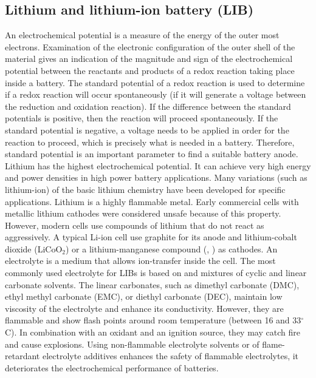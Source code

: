 {\subsection{Lithium and lithium-ion battery (LIB)}
An electrochemical potential is a measure of the energy of the outer most electrons. Examination of the electronic configuration of the outer shell of the material gives an indication of the magnitude and sign of the electrochemical potential between the reactants and products of a redox reaction taking place inside a battery. The standard potential of a redox reaction is used to determine if a redox reaction will occur spontaneously (if it will generate a voltage between the reduction and oxidation reaction). If the difference between the standard potentials is positive, then the reaction will proceed spontaneously. If the standard potential is negative, a voltage needs to be applied in order for the reaction to proceed, which is precisely what is needed in a battery. Therefore, standard potential is an important parameter to find a suitable battery anode. Lithium has the highest electrochemical potential. It can achieve very high energy and power densities in high power battery applications. Many variations (such as lithium-ion) of the basic lithium chemistry have been developed for specific applications. Lithium is a highly flammable metal. Early commercial cells with metallic lithium cathodes were considered unsafe because of this property. However, modern cells use compounds of lithium that do not react as aggressively. A typical Li-ion cell use graphite for its anode and lithium-cobalt dioxide (LiCoO$_2$) or a lithium-manganese compound (, ) as cathodes. An electrolyte is a medium that allows ion-transfer inside the cell. The most commonly used electrolyte for LIBs is based on  and mixtures of cyclic and linear carbonate solvents. The linear carbonates, such as dimethyl carbonate (DMC), ethyl methyl carbonate (EMC), or diethyl carbonate (DEC), maintain low viscosity of the electrolyte and enhance its conductivity. However, they are flammable and show flash points around room temperature (between 16 and 33$^{\circ}$C). In combination with an oxidant and an ignition source, they may catch fire and cause explosions. Using non-flammable electrolyte solvents or of flame-retardant electrolyte additives enhances the safety of flammable electrolytes, it deteriorates the electrochemical performance of batteries. 
}
